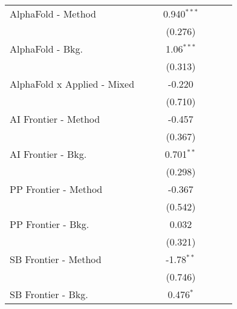 \begin{tabular}{lcccccc}
   AlphaFold - Method             &               &              & 0.940$^{***}$ &              &        &   \\   
                                  &               &              & (0.276)       &              &        &   \\   
   AlphaFold - Bkg.               &               &              & 1.06$^{***}$  &              &        &   \\   
                                  &               &              & (0.313)       &              &        &   \\   
   AlphaFold x Applied - Mixed    &               &              & -0.220        &              &        &   \\   
                                  &               &              & (0.710)       &              &        &   \\   
   AI Frontier - Method           &               &              & -0.457        &              &        &   \\   
                                  &               &              & (0.367)       &              &        &   \\   
   AI Frontier - Bkg.             &               &              & 0.701$^{**}$  &              &        &   \\   
                                  &               &              & (0.298)       &              &        &   \\   
   PP Frontier - Method           &               &              & -0.367        &              &        &   \\   
                                  &               &              & (0.542)       &              &        &   \\   
   PP Frontier - Bkg.             &               &              & 0.032         &              &        &   \\   
                                  &               &              & (0.321)       &              &        &   \\   
   SB Frontier - Method           &               &              & -1.78$^{**}$  &              &        &   \\   
                                  &               &              & (0.746)       &              &        &   \\   
   SB Frontier - Bkg.             &               &              & 0.476$^{*}$   &              &        &   \\   

\end{tabular}
